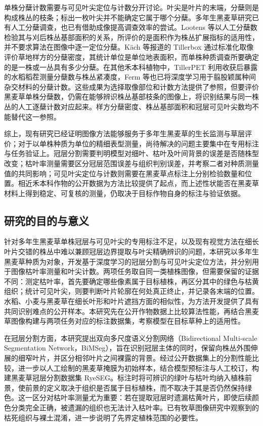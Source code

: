 单株分蘖计数需要与可见叶尖定位与计数分开讨论。叶尖是叶片的末端，分蘖则是构成株丛的枝条；标出一枚叶尖并不能确定它属于哪个分蘖。多年生黑麦草研究已有人工分蘖调查，也已有借助成像提高调查效率的尝试。Lootens 等以人工分蘖数检验其与刈后株丛基部面积的关系，所评价的是面积作为株丛扩展指标的适用性，并不要求算法在图像中逐一定位分蘖。Käch 等报道的 Tillerbox 通过标准化取像评价草地样方的分蘖密度，其统计单位是单位地表面积，而单株种质调查所要确定的是一株或一丛具有多少分蘖。在其他禾本科植物中，TillerPET 利用收获后暴露的水稻稻茬测量分蘖数与株丛紧凑度，Ferm 等也已将深度学习用于翦股颖属种间杂交材料的分蘖计数。这些成果为选择取像部位和计数方法提供了参照，但要评价黑麦草单株分蘖数，仍需在能够辨识株丛基部枝条的图像上，将识别结果与同一株丛的人工逐蘖计数对应起来。样方分蘖密度、株丛基部面积和冠层可见叶尖数均不能替代这一参照。

综上，现有研究已经证明图像方法能够服务于多年生黑麦草的生长监测与草层评价；对于以单株种质为单位的精细表型测量，尚待解决的问题主要集中在专用标注与任务验证上。冠层分割需要判明模型对细叶、枯叶及叶间背景的误差是否随株型改变；枯叶率测量需要区分冠层范围误差与组织判别误差，并考察二者对种质测量值的共同影响；可见叶尖定位与计数则需要在黑麦草点标注上分别检验数量和位置。相近禾本科作物的公开数据为方法比较提供了起点，而上述性状能否在黑麦草材料上得到稳定、可复核的测量，仍取决于目标作物自身的标注与验证依据。

\subsection{研究的目的与意义}
\label{sec:research-purpose-significance}

针对多年生黑麦草单株冠层与可见叶尖的专用标注不足，以及现有视觉方法在细长叶片交错的株丛中难以兼顾冠层边界提取与叶尖精确辨识的问题，本研究以多年生黑麦草种质为对象，开发基于深度学习的冠层分割与可见叶尖定位方法，并分别用于图像枯叶率测量和叶尖计数。两项任务取自同一类植株图像，但需要保留的证据不同：测定枯叶率，首先要确定哪些像素属于目标植株，再区分其中的绿色与枯黄组织；统计可见叶尖，则要判断叶片轮廓在何处真正终止，并记录各末端的位置。水稻、小麦与黑麦草在细长叶形和叶片遮挡方面的相似性，为方法开发提供了具有共同识别难点的公开样本。本研究先在公开作物数据上比较算法性能，再结合黑麦草图像构建与两项任务对应的标注数据集，考察模型在目标草种上的适用性。

在冠层分割方面，本研究提出双向多尺度语义分割网络（Bidirectional Multi-scale Segmentation Network，BiMSeg），旨在识别冠层主体的同时，保留向株丛外围伸展的细窄叶片，并区分相邻叶片之间裸露的背景。经过公开数据集上的分割性能比较，进一步以人工绘制的黑麦草掩膜为初始样本，结合模型预标注与人工校订，构建黑麦草冠层分割数据集 RyeSEG。标注时将可辨识的绿叶与枯叶均纳入植株前景，使前景的定义取决于组织是否属于目标植株，而不取决于其是否仍然保持绿色。这一区分对枯叶率测量尤为重要：若在提取冠层时遗漏枯黄叶片，即使后续颜色分类完全正确，被遗漏的组织也无法计入枯叶率。已有牧草图像研究中观察到的枯死组织与裸土混淆，进一步说明了先界定植株范围的必要性。

